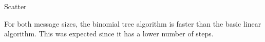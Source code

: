 \begin{frame}[fragile]{Scatter}
\begin{multicols}{2}
\begin{figure}[H]


        \end{figure}

        \columnbreak

        For both message sizes, the binomial tree algorithm is faster
        than the basic linear algorithm. This was expected since it
        has a lower number of steps.
    \end{multicols}
\end{frame}



